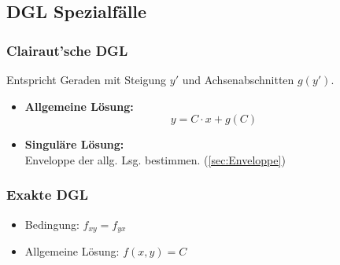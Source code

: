 \subsection{DGL Spezialfälle}
    \subsubsection{Clairaut'sche DGL}
        Entspricht Geraden mit Steigung $y'$ und Achsenabschnitten $g(y')$.
        \begin{itemize}
            \item \textbf{Allgemeine Lösung:}
            $$
                y = C\cdot x + g(C)
            $$
            \item \textbf{Singuläre Lösung:}\\
                Enveloppe der allg. Lsg. bestimmen. (\ref{sec:Enveloppe})
        \end{itemize}

    \subsubsection{Exakte DGL}
        \vspace{0.5em}
        \begin{itemize}
            \item Bedingung: $f_{xy} = f_{yx}$
            \item Allgemeine Lösung: $f(x,y) = C$
        \end{itemize}